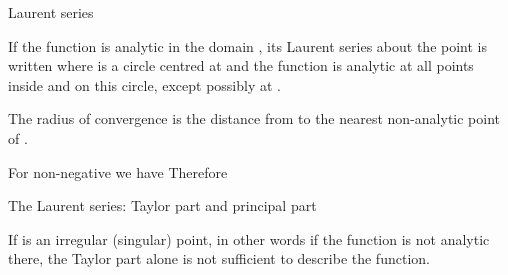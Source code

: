 \EMhold


\begin{EMtheorem}{Laurent series}

If the function  is analytic in the domain , its Laurent series about the point  is written
where  is a circle centred at  and the function is analytic at all points inside and on this circle, except possibly at .

The radius of convergence is the distance from  to the nearest non-analytic point of .

\end{EMtheorem}

For non-negative  we have
Therefore

\begin{EMimportant}{The Laurent series: Taylor part and principal part}


\end{EMimportant}

If  is an irregular (singular) point, in other words if the function is not analytic there, the Taylor part alone is not sufficient to describe the function.



